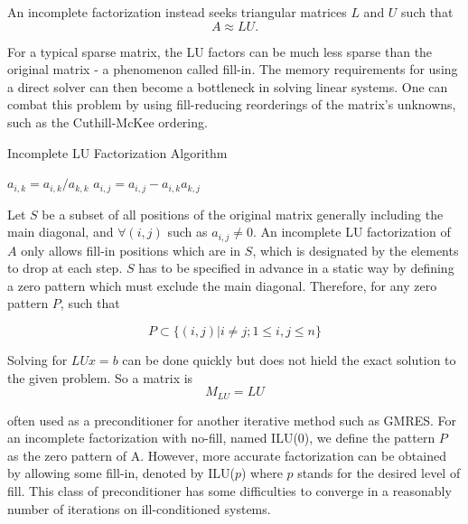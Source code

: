 An incomplete factorization \cite{saad1994ilut,sertel2000incomplete, lee2003incomplete,malas2007incomplete} instead seeks triangular matrices $L$ and $U$ such that 
\[A \approx LU.\]

For a typical sparse matrix, the LU factors can be much less sparse than the original matrix - a phenomenon called fill-in. The memory requirements for using a direct solver can then become a bottleneck in solving linear systems. One can combat this problem by using fill-reducing reorderings of the matrix's unknowns, such as the Cuthill-McKee ordering. 

\begin{algorithm}[htbp]
	\caption{Incomplete LU Factorization Algorithm}
	\label{alg:ilu}
	\begin{algorithmic}[1]
					\State $a_{i,k} = a_{i,k}/a_{k,k}$
							\State $a_{i,j} = a_{i,j}-a_{i,k}a_{k,j}$
						\EndIf
					\EndFor
				\EndIf
			\EndFor
		\EndFor
	\end{algorithmic}
\end{algorithm}

Let $S$ be a subset of all positions of the original matrix generally including the main diagonal, and $\forall (i, j)$ such as $a_{i,j} \neq 0$. An incomplete LU factorization of $A$ only allows fill-in positions which are in $S$, which is designated by the elements to drop at each step. $S$ has to be specified in advance in a static way by defining a zero pattern which must exclude the main diagonal. Therefore, for any zero pattern $P$, such that

\begin{equation}
	P \subset \{ (i,j) | i \neq j; 1 \leq i,j\leq n\}
\end{equation}


Solving for $LUx=b$ can be done quickly but does not hield the exact solution to the given problem. So a matrix is \[M_{LU} = LU\]

often used as a preconditioner for another iterative method such as GMRES. For an incomplete factorization with no-fill, named ILU(0), we define the pattern $P$ as the zero pattern of A. However, more accurate factorization can be obtained by allowing some fill-in, denoted by ILU($p$) where $p$ stands for the desired level of fill. This class of preconditioner has some difficulties to converge in a reasonably number of iterations on ill-conditioned systems.

